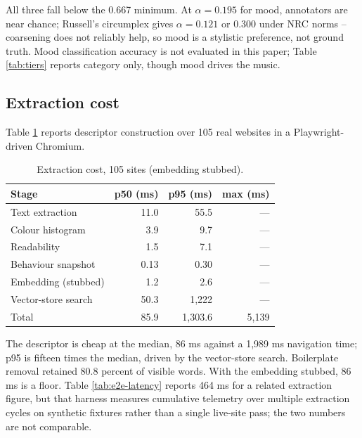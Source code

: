 \documentclass[conference]{IEEEtran}
\let\IEEEoriginalcaption\caption
\renewcommand{\caption}[1]{\IEEEoriginalcaption{\footnotesize #1}}
\begin{document}
All three fall below the 0.667 minimum. At $\alpha=0.195$ for mood,
annotators are near chance; Russell's circumplex \cite{russell} gives
$\alpha=0.121$ or $0.300$ under NRC norms \cite{nrcvad} -- coarsening does
not reliably help, so mood is a stylistic preference, not ground truth.
Mood classification accuracy is not evaluated in this paper; Table
\ref{tab:tiers} reports category only, though mood drives the music.

\subsection{Extraction cost}
\label{sec:res-extraction}

Table \ref{tab:extraction} reports descriptor construction over 105 real
websites in a Playwright-driven Chromium.

\begin{table}[t]
\caption{Extraction cost, 105 sites (embedding stubbed).}
\label{tab:extraction}
\begin{center}
\scriptsize
\begin{tabular}{lrrr}
\toprule
\textbf{Stage} & \textbf{p50 (ms)} & \textbf{p95 (ms)} & \textbf{max (ms)} \\
\midrule
Text extraction & 11.0 & 55.5 & --- \\
Colour histogram & 3.9 & 9.7 & --- \\
Readability & 1.5 & 7.1 & --- \\
Behaviour snapshot & 0.13 & 0.30 & --- \\
Embedding (stubbed) & 1.2 & 2.6 & --- \\
Vector-store search & 50.3 & 1{,}222 & --- \\
\midrule
Total & 85.9 & 1{,}303.6 & 5{,}139 \\
\bottomrule
\end{tabular}
\end{center}
\end{table}

The descriptor is cheap at the median, 86 ms against a 1,989 ms
navigation time; p95 is fifteen times the median, driven by the
vector-store search. Boilerplate removal retained 80.8 percent of visible
words. With the embedding stubbed, 86 ms is a floor. Table
\ref{tab:e2e-latency} reports 464 ms for a related extraction figure, but
that harness measures cumulative telemetry over multiple extraction
cycles on synthetic fixtures rather than a single live-site pass; the two
numbers are not comparable.
\end{document}
